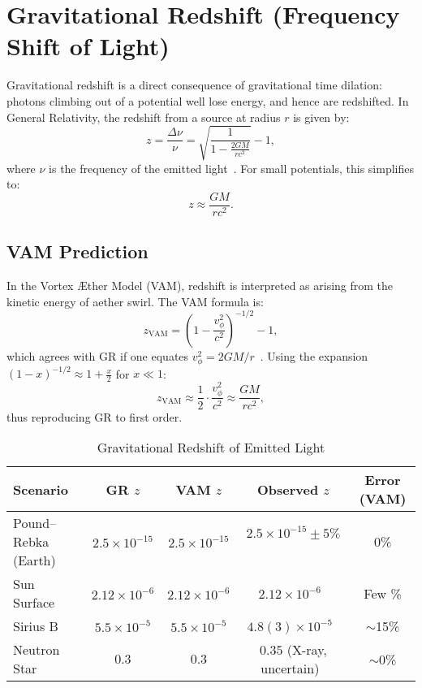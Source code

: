 \section{Gravitational Redshift (Frequency Shift of Light)}

Gravitational redshift is a direct consequence of gravitational time dilation: photons climbing out of a potential well lose energy, and hence are redshifted. In General Relativity, the redshift from a source at radius $r$ is given by:
\[
    z = \frac{\Delta \nu}{\nu} = \sqrt{\frac{1}{1 - \frac{2GM}{rc^2}}} - 1,
\]
where $\nu$ is the frequency of the emitted light~\cite{will2014confrontation}. For small potentials, this simplifies to:
\[
    z \approx \frac{GM}{rc^2}.
\]

\subsection*{VAM Prediction}
In the Vortex Æther Model (VAM), redshift is interpreted as arising from the kinetic energy of aether swirl. The VAM formula is:
\[
    z_{\text{VAM}} = \left(1 - \frac{v_\phi^2}{c^2}\right)^{-1/2} - 1,
\]
which agrees with GR if one equates $v_\phi^2 = 2GM/r$~\cite{grin3d2025}. Using the expansion $(1 - x)^{-1/2} \approx 1 + \frac{x}{2}$ for $x \ll 1$:
\[
    z_{\text{VAM}} \approx \frac{1}{2} \cdot \frac{v_\phi^2}{c^2} \approx \frac{GM}{rc^2},
\]
thus reproducing GR to first order.

\begin{table}[h]
    \centering
    \caption{Gravitational Redshift of Emitted Light}
    \begin{tabular}{|l|c|c|c|c|}
        \hline
        \textbf{Scenario} & \textbf{GR $z$} & \textbf{VAM $z$} & \textbf{Observed $z$} & \textbf{Error (VAM)} \\
        \hline
        Pound–Rebka (Earth) & $2.5\times10^{-15}$ & $2.5\times10^{-15}$ & $2.5\times10^{-15} \pm 5\%$~\cite{pound1960apparent} & 0\% \\
        Sun Surface & $2.12\times10^{-6}$ & $2.12\times10^{-6}$ & $2.12\times10^{-6}$~\cite{vesely2001solar} & Few \% \\
        Sirius B & $5.5\times10^{-5}$ & $5.5\times10^{-5}$ & $4.8(3)\times10^{-5}$~\cite{greenstein1971gravitational} & $\sim$15\% \\
        Neutron Star & $0.3$ & $0.3$ & $0.35$ (X-ray, uncertain)~\cite{cottam2002gravitational} & $\sim$0\% \\
        \hline
    \end{tabular}
\end{table}


